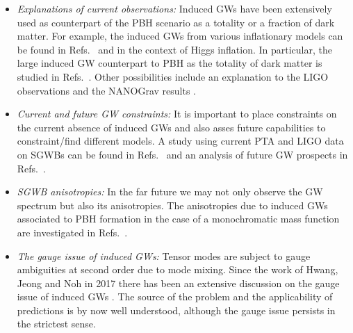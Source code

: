 \documentclass[a4paper,11pt]{article}
\numberwithin{equation}{section}
\begin{document}
\begin{itemize}
\item[--] \textit{Explanations of current observations:} Induced GWs have been extensively used as counterpart of the PBH scenario as a totality or a fraction of dark matter. For example, the induced GWs from various inflationary models can be found in Refs.~\cite{Garcia-Bellido:2016dkw,Gong:2017qlj,Ando:2018nge,Byrnes:2018txb,Gao:2019kto,Xu:2019bdp,Mahbub:2019uhl,Mishra:2019pzq,Fu:2019vqc,Ozsoy:2019lyy,Ozsoy:2020kat,Gao:2020tsa,Bhaumik:2020dor,Lin:2020goi,Ragavendra:2020sop,Yi:2020cut,Gao:2021vxb,Gao:2021dfi,Solbi:2021wbo} and \cite{Espinosa:2018eve,Drees:2019xpp,Yi:2020kmq,Gao:2021vxb} in the context of Higgs inflation. In particular, the large induced GW counterpart to PBH as the totality of dark matter is studied in Refs.~\cite{Garcia-Bellido:2017aan,Kohri:2018qtx,Bartolo:2018evs,Bartolo:2018rku,Tada:2019amh,Ballesteros:2020qam,Ozsoy:2020kat}. Other possibilities include an explanation to the LIGO observations \cite{Inomata:2016rbd,Nakama:2016gzw,Ando:2017veq,Kohri:2018qtx} and the NANOGrav results \cite{Vaskonen:2020lbd,DeLuca:2020agl,Kohri:2020qqd,Domenech:2020ers,Bhattacharya:2020lhc,Inomata:2020xad,Yi:2021lxc}. 
\item[--] \textit{Current and future GW constraints:} It is important to place constraints on the current absence of induced GWs and also asses future capabilities to constraint/find different models. A study using current PTA and LIGO data on SGWBs can be found in Refs.~\cite{Orlofsky:2016vbd,Cai:2019elf,Chen:2019xse,Chen:2019irf} and an analysis of future GW prospects in Refs.~\cite{Inomata:2018epa,Clesse:2018ogk,Wang:2019kaf,Yuan:2019udt,Lu:2019sti,Unal:2020mts,Dalianis:2020cla,Zhang:2020ptw,Wang:2016tbj}.
\item[--] \textit{SGWB anisotropies:} In the far future we may not only observe the GW spectrum but also its anisotropies. The anisotropies due to induced GWs associated to PBH formation in the case of a monochromatic mass function are investigated in Refs.~\cite{Bartolo:2018qqn,Bartolo:2018evs,Bartolo:2018rku,Bartolo:2019zvb}.
\item[--] \textit{The gauge issue of induced GWs:} Tensor modes are subject to gauge ambiguities at second order due to mode mixing. Since the work of Hwang, Jeong and Noh \cite{Hwang:2017oxa} in 2017 there has been an extensive discussion on the gauge issue of induced GWs \cite{Domenech:2017ems,Gong:2019mui,Tomikawa:2019tvi,DeLuca:2019ufz,Inomata:2019yww,Yuan:2019fwv,Chang:2020iji,Chang:2020tji,Lu:2020diy,Ali:2020sfw,Chang:2020mky,Domenech:2020xin,Gurian:2021rfv}. The source of the problem and the applicability of predictions is by now well understood, although the gauge issue persists in the strictest sense.
\end{itemize}
\end{document}
